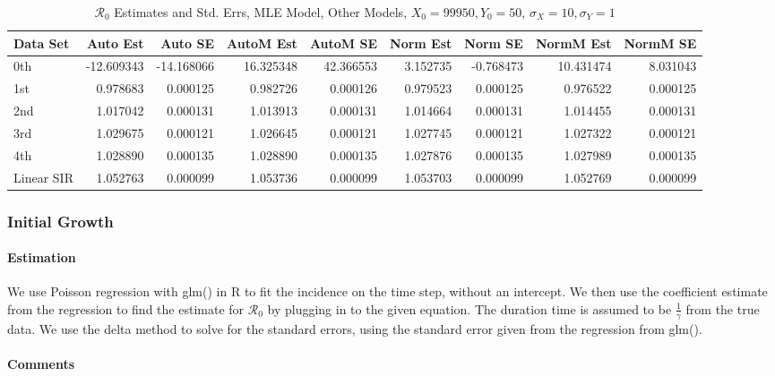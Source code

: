 \documentclass[12pt]{article}
\newcommand{\rr}{\ensuremath{\mathcal{R}_0}}
\begin{document}
\begin{table}[H]
	
	\caption{$\rr$ Estimates and Std. Errs, MLE Model,
		Other Models, $X_0 = 99950, Y_0 = 50$, 
		$\sigma_X = 10, \sigma_Y = 1$}
	\begin{footnotesize}
		\hskip -1cm
		\begin{tabular}{l|r|r|r|r|r|r|r|r}
			\hline
			Data Set & Auto Est & Auto SE & AutoM Est & AutoM SE & Norm Est & Norm SE & NormM Est & NormM SE\\
			\hline
			0th & -12.609343 & -14.168066 & 16.325348 & 42.366553 & 3.152735 & -0.768473 & 10.431474 & 8.031043\\
			\hline
			1st & 0.978683 & 0.000125 & 0.982726 & 0.000126 & 0.979523 & 0.000125 & 0.976522 & 0.000125\\
			\hline
			2nd & 1.017042 & 0.000131 & 1.013913 & 0.000131 & 1.014664 & 0.000131 & 1.014455 & 0.000131\\
			\hline
			3rd & 1.029675 & 0.000121 & 1.026645 & 0.000121 & 1.027745 & 0.000121 & 1.027322 & 0.000121\\
			\hline
			4th & 1.028890 & 0.000135 & 1.028890 & 0.000135 & 1.027876 & 0.000135 & 1.027989 & 0.000135\\
			\hline
			Linear SIR & 1.052763 & 0.000099 & 1.053736 & 0.000099 & 1.053703 & 0.000099 & 1.052769 & 0.000099\\
			\hline
		\end{tabular}
	\end{footnotesize}
\end{table}

\subsubsection{Initial Growth}

\paragraph{Estimation}

We use Poisson regression with glm() in R to fit the incidence on the time step, without an intercept. We then use the coefficient estimate from the regression to find the estimate for $\rr$ by plugging in to the given equation. The duration time is assumed to be $\frac{1}{\gamma}$ from the true data. We use the delta method to solve for the standard errors, using the standard error given from the regression from glm().

\paragraph{Comments}
\end{document}
